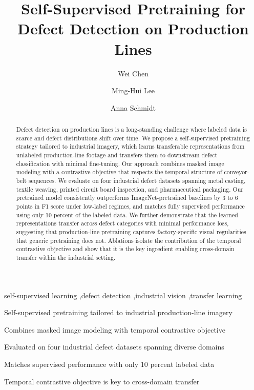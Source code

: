 \documentclass[a4paper,fleqn]{cas-dc}
\begin{document}
\title[mode=title]{Self-Supervised Pretraining for Defect Detection on Production Lines}

\author[1]{Wei Chen}
\cormark[1]

\author[1]{Ming-Hui Lee}

\author[2]{Anna Schmidt}




\begin{abstract}
Defect detection on production lines is a long-standing challenge where
labeled data is scarce and defect distributions shift over time. We propose
a self-supervised pretraining strategy tailored to industrial imagery,
which learns transferable representations from unlabeled production-line
footage and transfers them to downstream defect classification with minimal
fine-tuning. Our approach combines masked image modeling with a contrastive
objective that respects the temporal structure of conveyor-belt sequences.
We evaluate on four industrial defect datasets spanning metal casting,
textile weaving, printed circuit board inspection, and pharmaceutical
packaging. Our pretrained model consistently outperforms ImageNet-pretrained
baselines by 3 to 6 points in F1 score under low-label regimes, and matches
fully supervised performance using only 10 percent of the labeled data.
We further demonstrate that the learned representations transfer across
defect categories with minimal performance loss, suggesting that
production-line pretraining captures factory-specific visual regularities
that generic pretraining does not. Ablations isolate the contribution of
the temporal contrastive objective and show that it is the key ingredient
enabling cross-domain transfer within the industrial setting.
\end{abstract}

\begin{keywords}
self-supervised learning \sep defect detection \sep industrial vision \sep transfer learning
\end{keywords}

\begin{highlights}
\item Self-supervised pretraining tailored to industrial production-line imagery
\item Combines masked image modeling with temporal contrastive objective
\item Evaluated on four industrial defect datasets spanning diverse domains
\item Matches supervised performance with only 10 percent labeled data
\item Temporal contrastive objective is key to cross-domain transfer
\end{highlights}
\end{document}
